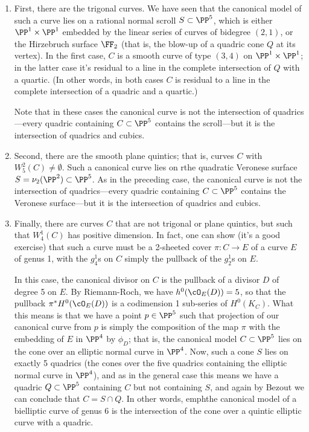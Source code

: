 \begin{enumerate}

\item First, there are the trigonal curves. We have seen that the canonical model of such a curve lies on a rational normal scroll $S \subset \PP^5$, which is either $\PP^1 \times \PP^1$ embedded by the linear series of curves of bidegree $(2,1)$, or the Hirzebruch surface $\FF_2$ (that is, the blow-up of a quadric cone $Q$ at its vertex). In the first case, $C$ is a smooth curve of type $(3,4)$ on $\PP^1 \times \PP^1$; in the latter case it's residual to a line in the complete intersection of $Q$ with a quartic. (In other words, in both cases $C$ is residual to a line in the complete intersection of a quadric  and a quartic.)

Note that in these cases the canonical curve is not the intersection of quadrics---every quadric containing $C \subset \PP^5$ contains the scroll---but it is the intersection of quadrics and cubics.

\item Second, there are the smooth plane quintics; that is, curves $C$ with $W^2_5(C) \neq \emptyset$. Such a canonical curve lies on rthe quadratic Veronese surface $S = \nu_2(\PP^2) \subset \PP^5$. As in the preceding case, the canonical curve is not the intersection of quadrics---every quadric containing $C \subset \PP^5$ contains the Veronese surface---but it is the intersection of quadrics and cubics.

\item Finally, there are curves $C$  that are not trigonal or plane quintics, but such that $W^1_4(C)$ has positive dimension. In fact, one can show (it's a good exercise) that such a curve must be a 2-sheeted cover $\pi : C \to E$ of a curve $E$ of genus 1, with the $g^1_4$s on $C$ simply the pullback of the $g^1_2$s on $E$.

In this case, the canonical divisor on $C$ is the pullback of a divisor $D$ of degree 5 on $E$. By Riemann-Roch, we have $h^0(\cO_E(D)) = 5$, so that the pullback $\pi^*H^0(\cO_E(D))$ is a codimension 1 sub-series of $H^0(K_C)$. What this means is that we have a point $p \in \PP^5$ such that projection of our canonical curve from $p$ is simply the composition of the map $\pi$ with the embedding of $E$ in $\PP^4$ by $\phi_D$; that is, the canonical model $C \subset \PP^5$ lies on the cone over an elliptic normal curve in $\PP^4$. Now, such a cone $S$ lies on exactly 5 quadrics (the cones over the five quadrics containing the elliptic normal curve in $\PP^4$), and as in the general case this means we have a quadric $Q \subset \PP^5$ containing $C$ but not containing $S$, and again by Bezout we can conclude that $C = S \cap Q$. In other words, emph{the canonical model of a bielliptic curve of genus 6 is the intersection of the cone over a  quintic elliptic curve with a quadric}.

\end{enumerate}


